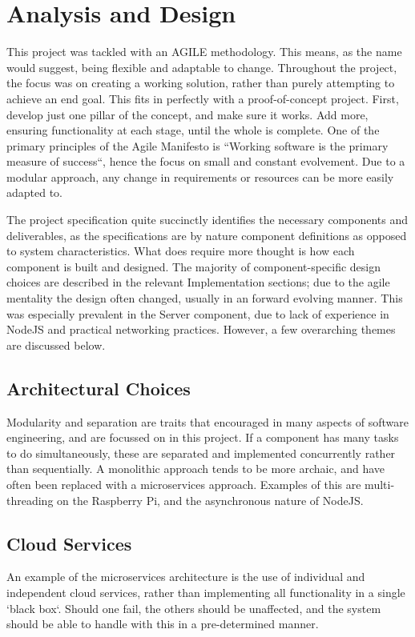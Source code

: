 \documentclass{article}
\begin{document}
\section{Analysis and Design}\label{AnalysisAndDesign}
This project was tackled with an AGILE methodology\cite{agileManifest}. This means, as the name would suggest, being flexible and adaptable to change. Throughout the project, the focus was on creating a working solution, rather than purely attempting to achieve an end goal. This fits in perfectly with a proof-of-concept project. First, develop just one pillar of the concept, and make sure it works. Add more, ensuring functionality at each stage, until the whole is complete. One of the primary principles of the Agile Manifesto is ``Working software is the primary measure of success``\cite{agileManifest}, hence the focus on small and constant evolvement. Due to a modular approach, any change in requirements or resources can be more easily adapted to. 

The project specification quite succinctly identifies the necessary components and deliverables, as the specifications are by nature component definitions as opposed to system characteristics. What does require more thought is how each component is built and designed. The majority of component-specific design choices are described in the relevant Implementation sections; due to the agile mentality the design often changed, usually in an forward evolving manner. This was especially prevalent in the Server component, due to lack of experience in NodeJS and practical networking practices. However, a few overarching themes are discussed below.

\subsection{Architectural Choices}
Modularity and separation are traits that encouraged in many aspects of software engineering, and are focussed on in this project. If a component has many tasks to do simultaneously, these are separated and implemented concurrently rather than sequentially. A monolithic approach tends to be more archaic, and have often been replaced with a microservices approach. Examples of this are multi-threading on the Raspberry Pi, and the asynchronous nature of NodeJS.

\subsection{Cloud Services}
An example of the microservices architecture is the use of individual and independent cloud services, rather than implementing all functionality in a single `black box`. Should one fail, the others should be unaffected, and the system should be able to handle with this in a pre-determined manner. 
\end{document}
